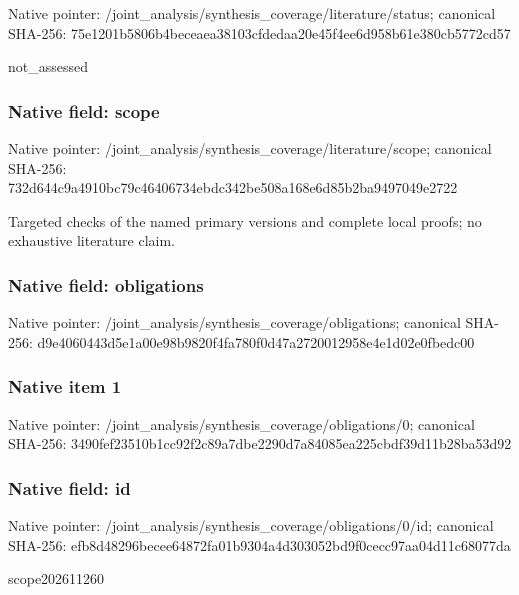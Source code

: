 \documentclass[10pt,a4paper]{article}
\begin{document}
Native pointer: /joint\_analysis/synthesi\allowbreak{}s\_coverage/literature/st\allowbreak{}atus; canonical SHA-256: 75e1201b5806b4beceaea381\allowbreak{}03cfdedaa20e45f4ee6d958b\allowbreak{}61e380cb5772cd57


not\_assessed


\subsubsection{Native field: scope}


Native pointer: /joint\_analysis/synthesi\allowbreak{}s\_coverage/literature/sc\allowbreak{}ope; canonical SHA-256: 732d644c9a4910bc79c46406\allowbreak{}734ebdc342be508a168e6d85\allowbreak{}b2ba9497049e2722


Targeted checks of the named primary versions and complete local proofs; no exhaustive literature claim.


\subsubsection{Native field: obligations}


Native pointer: /joint\_analysis/synthesi\allowbreak{}s\_coverage/obligations; canonical SHA-256: d9e4060443d5e1a00e98b982\allowbreak{}0f4fa780f0d47a2720012958\allowbreak{}e4e1d02e0fbedc00



\subsubsection{Native item 1}


Native pointer: /joint\_analysis/synthesi\allowbreak{}s\_coverage/obligations/0; canonical SHA-256: 3490fef23510b1cc92f2c89a\allowbreak{}7dbe2290d7a84085ea225cbd\allowbreak{}f39d11b28ba53d92



\subsubsection{Native field: id}


Native pointer: /joint\_analysis/synthesi\allowbreak{}s\_coverage/obligations/0\allowbreak{}/id; canonical SHA-256: efb8d48296becee64872fa01\allowbreak{}b9304a4d303052bd9f0cecc9\allowbreak{}7aa04d11c68077da


scope202611260
\end{document}
